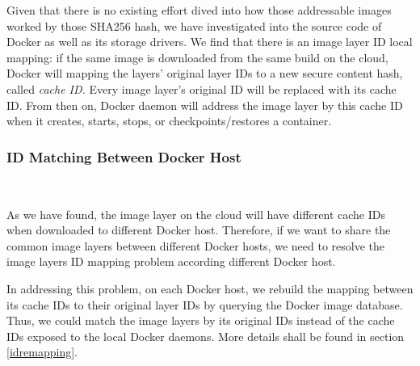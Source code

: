 %
%
Given that there is no existing effort dived into how those addressable images worked by those SHA256 hash, we have investigated into the source code of Docker as well as its storage drivers.
We find that there is an image layer ID local mapping: if the same image is downloaded from the same build on the cloud, Docker will mapping the layers' original layer IDs to a new secure content hash, called \textit{cache ID.} Every image layer's original ID will be replaced with its cache ID. From then on, Docker daemon will address the image layer by this cache ID when it creates, starts, stops, or checkpoints/restores a container. 

\smallbreak
\subsubsection{ID Matching Between Docker Host} \label{intro:idMatching}
~\smallbreak

As we have found, 
the image layer on the cloud will have different cache IDs when downloaded to different Docker host. 
Therefore, if we want to share the common image layers between different Docker hosts, we need to resolve the image layers ID mapping problem according different Docker host. 

In addressing this problem, on each Docker host, we rebuild the mapping between its cache IDs to their original layer IDs by querying the Docker image database. 
Thus, we could match the image layers by its original IDs instead of the cache IDs exposed to the local Docker daemons. More details shall be found in section \ref{idremapping}.



